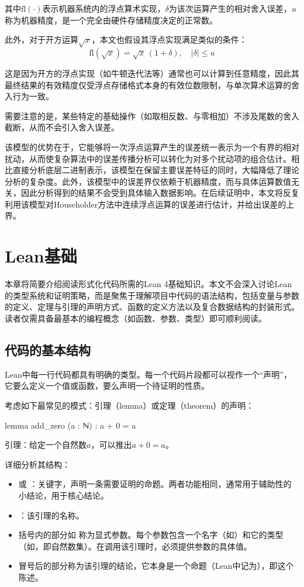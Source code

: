 ﻿\documentclass[UTF8,a4paper,openany]{ctexbook}
\theoremstyle{qrplain}
\begin{document}
其中$\mathrm{fl}(\cdot)$表示机器系统内的浮点算术实现，$\delta$为该次运算产生的相对舍入误差，$u$称为机器精度，是一个完全由硬件存储精度决定的正常数。

此外，对于开方运算$\sqrt{x}$，本文也假设其浮点实现满足类似的条件：
$$\mathrm{fl}(\sqrt{x})=\sqrt{x}\,(1+\delta),\quad |\delta|\le u$$

这是因为开方的浮点实现（如牛顿迭代法等）通常也可以计算到任意精度，因此其最终结果的有效精度仅受浮点存储格式本身的有效位数限制，与单次算术运算的舍入行为一致。

需要注意的是，某些特定的基础操作（如取相反数、与零相加）不涉及尾数的舍入截断，从而不会引入舍入误差。

该模型的优势在于，它能够将一次浮点运算产生的误差统一表示为一个有界的相对扰动，从而使复杂算法中的误差传播分析可以转化为对多个扰动项的组合估计。相比直接分析底层二进制表示，该模型在保留主要误差特征的同时，大幅降低了理论分析的复杂度。此外，该模型中的误差界仅依赖于机器精度，而与具体运算数值无关，因此分析得到的结果不会受到具体输入数据影响。在后续证明中，本文将反复利用该模型对Householder方法中连续浮点运算的误差进行估计，并给出误差的上界。

\chapter{Lean基础}

本章将简要介绍阅读形式化代码所需的Lean 4基础知识。本文不会深入讨论Lean的类型系统和证明策略，而是聚焦于理解项目中代码的语法结构，包括变量与参数的定义、定理与引理的声明方式、函数的定义方法以及复合数据结构的封装形式。读者仅需具备最基本的编程概念（如函数、参数、类型）即可顺利阅读。

\section{代码的基本结构}

Lean中每一行代码都具有明确的类型。每一个代码片段都可以视作一个“声明”，它要么定义一个值或函数，要么声明一个待证明的性质。

考虑如下最常见的模式：引理（lemma）或定理（theorem）的声明：

\begin{leancode}
  lemma add_zero (a : ℕ) : a + 0 = a
\end{leancode}

引理：给定一个自然数$a$，可以推出$a + 0 = a$。

详细分析其结构：

\begin{itemize}
  \item {} 或 ：关键字，声明一条需要证明的命题。两者功能相同，通常用于辅助性的小结论，用于核心结论。
  \item {}：该引理的名称。
  \item 括号内的部分如  称为显式参数。每个参数包含一个名字（如）和它的类型（如，即自然数集）。在调用该引理时，必须提供参数的具体值。
  \item 冒号后的部分称为该引理的结论，它本身是一个命题（Lean中记为），即这个陈述。
\end{itemize}
\end{document}
